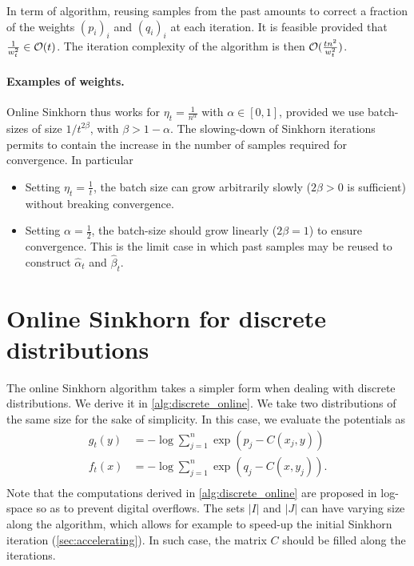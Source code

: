 In term of algorithm, reusing samples from the past amounts to correct a fraction of the weights
$(p_i)_i$ and $(q_i)_i$ at each iteration. It is feasible provided that $\frac{1}{w_t^2} \in \mathcal{O}(t)$. The iteration complexity of the algorithm is then
$\mathcal{O}(\frac{t n^2}{w_t^2})$.

\paragraph{Examples of weights.}

Online Sinkhorn thus works for $\eta_t = \frac{1}{n^\alpha}$ with $\alpha \in
[0, 1]$, provided we use batch-sizes of size $1 / t^{2\beta}$, with $\beta
> 1 - \alpha$. The slowing-down of Sinkhorn iterations permits to contain the
increase in the number of samples required for convergence. In particular
\begin{itemize}
    \item Setting $\eta_t = \frac{1}{t}$, the batch size can grow arbitrarily slowly ($2
    \beta > 0$ is sufficient) without breaking convergence. 
    \item Setting $\alpha = \frac{1}{2}$, the batch-size should grow linearly
    ($2 \beta = 1$) to ensure convergence. This is the limit case in which past
    samples may be reused to construct $\hat \alpha_t$ and $\hat \beta_t$.
\end{itemize}

\section{Online Sinkhorn for discrete distributions}\label{sec:sinkhorn_discrete}

The online Sinkhorn algorithm takes a simpler form when dealing with discrete
distributions. We derive it in \autoref{alg:discrete_online}. We take two
distributions of the same size for the sake of simplicity. In this case, we evaluate the potentials as
\begin{align}
    g_t(y) &= - \log \sum_{j=1}^n \exp(p_j - C(x_j, y)) \\
    f_t(x) &= - \log \sum_{j=1}^n \exp(q_j - C(x, y_j)). \\
\end{align}
Note that the computations derived in \autoref{alg:discrete_online} are proposed
in log-space so as to prevent digital overflows. The sets $|I|$ and $|J|$ can
have varying size along the algorithm, which allows for example to speed-up the
initial Sinkhorn iteration (\autoref{sec:accelerating}). In such case, the
matrix $C$ should be filled along the iterations.

